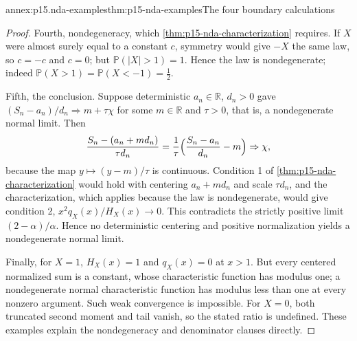 \begin{annexitem}{annex:p15.nda-examples}{thm:p15-nda-examples}{The four boundary calculations}
\begin{proof}
Fourth, nondegeneracy, which
\cref{thm:p15-nda-characterization} requires. If \(X\) were
almost surely equal to a constant \(c\), symmetry would give
\(-X\) the same law, so \(c=-c\) and \(c=0\); but
\(\mathbb P(|X|>1)=1\). Hence the law is nondegenerate; indeed
\(\mathbb P(X>1)=\mathbb P(X<-1)=\tfrac12\).

Fifth, the conclusion. Suppose deterministic \(a_n\in\mathbb R\),
\(d_n>0\) gave \((S_n-a_n)/d_n\Rightarrow m+\tau\chi\) for some
\(m\in\mathbb R\) and \(\tau>0\), that is, a nondegenerate normal
limit. Then
\[
 \frac{S_n-(a_n+md_n)}{\tau d_n}
 =\frac1\tau\Bigl(\frac{S_n-a_n}{d_n}-m\Bigr)\Rightarrow\chi,
 \]
because the map \(y\mapsto(y-m)/\tau\) is continuous.
Condition 1 of \cref{thm:p15-nda-characterization} would hold
with centering \(a_n+md_n\) and scale \(\tau d_n\), and the
characterization, which applies because the law is nondegenerate,
would give condition 2, \(x^2q_X(x)/H_X(x)\to0\).
This contradicts the strictly positive limit
\((2-\alpha)/\alpha\). Hence no deterministic centering and
positive normalization yields a nondegenerate normal limit.

Finally, for \(X=1\), \(H_X(x)=1\) and \(q_X(x)=0\) at \(x>1\).
But every centered normalized sum is a constant, whose
characteristic function has modulus one; a nondegenerate
normal characteristic function has modulus less than one at
every nonzero argument. Such weak convergence is impossible.
For \(X=0\), both truncated second moment and tail vanish,
so the stated ratio is undefined. These examples explain the
nondegeneracy and denominator clauses directly.
\end{proof}
\end{annexitem}
